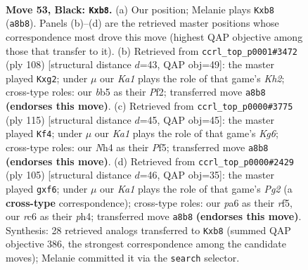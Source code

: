 \documentclass[11pt]{article}
\begin{document}
\clearpage

\begin{figure}[p]\centering
\begin{subfigure}{0.46\textwidth}\centering
\resizebox{\linewidth}{!}{%
\newchessgame
\chessboard[
  setfen={kB4r1/p7/PpR4b/1B3p2/5P1n/4K3/8/8 b - - 2 53},
  showmover=false,
  pgfstyle=straightmove, color=movearrow, markmove={a8-b8}
]}
\caption{}
\end{subfigure}\hfill
\begin{subfigure}{0.46\textwidth}\centering
\resizebox{\linewidth}{!}{%
\newchessgame
\chessboard[
  setfen={5k2/8/7p/6p1/3Rp1P1/1r5P/5PbK/8 w - - 0 55},
  showmover=false,
  pgfstyle=straightmove, color=movearrow, markmove={h2-g2}
]}
\caption{}
\end{subfigure}
\\[4pt]
\begin{subfigure}{0.46\textwidth}\centering
\resizebox{\linewidth}{!}{%
\newchessgame
\chessboard[
  setfen={8/1b4R1/p7/3P1p2/3r4/6k1/PP4Bp/7K b - - 1 58},
  showmover=false,
  pgfstyle=straightmove, color=movearrow, markmove={g3-f4}
]}
\caption{}
\end{subfigure}\hfill
\begin{subfigure}{0.46\textwidth}\centering
\resizebox{\linewidth}{!}{%
\newchessgame
\chessboard[
  setfen={8/5kp1/5B2/5R1p/4p2P/2P1K1P1/8/r7 b - - 0 53},
  showmover=false,
  pgfstyle=straightmove, color=movearrow, markmove={g7-f6}
]}
\caption{}
\end{subfigure}
\caption{\textbf{Move 53, Black: \texttt{Kxb8}.} (a) Our position; Melanie plays \texttt{Kxb8} (\texttt{a8b8}). Panels (b)--(d) are the retrieved master positions whose correspondence most drove this move (highest QAP objective among those that transfer to it). (b) Retrieved from \texttt{ccrl\_top\_p0001\#3472} (ply 108) [structural distance $d$=43, QAP obj=49]: the master played \texttt{Kxg2}; under $\mu$ our \emph{Ka1} plays the role of that game's \emph{Kh2}; cross-type roles: our \emph{b}b5 as their \emph{P}f2; transferred move \texttt{a8b8} \textbf{(endorses this move)}. (c) Retrieved from \texttt{ccrl\_top\_p0000\#3775} (ply 115) [structural distance $d$=45, QAP obj=45]: the master played \texttt{Kf4}; under $\mu$ our \emph{Ka1} plays the role of that game's \emph{Kg6}; cross-type roles: our \emph{N}h4 as their \emph{P}f5; transferred move \texttt{a8b8} \textbf{(endorses this move)}. (d) Retrieved from \texttt{ccrl\_top\_p0000\#2429} (ply 105) [structural distance $d$=46, QAP obj=35]: the master played \texttt{gxf6}; under $\mu$ our \emph{Ka1} plays the role of that game's \emph{Pg2} (a \textbf{cross-type} correspondence); cross-type roles: our \emph{p}a6 as their \emph{r}f5, our \emph{r}c6 as their \emph{p}h4; transferred move \texttt{a8b8} \textbf{(endorses this move)}. Synthesis: 28 retrieved analogs transferred to \texttt{Kxb8} (summed QAP objective 386, the strongest correspondence among the candidate moves); Melanie committed it via the \texttt{search} selector.}
\label{fig:thought-m105}
\end{figure}
\end{document}
